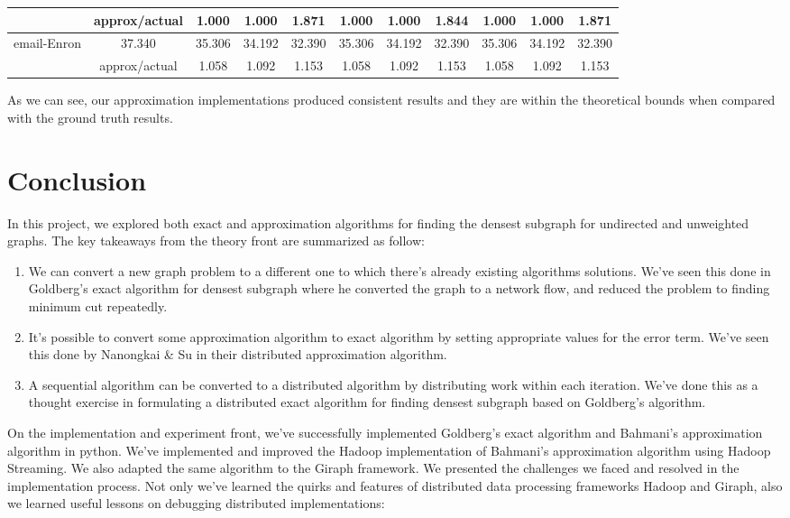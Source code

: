 \documentclass{article}
\begin{document}
\begin{landscape}
\begin{tabular}{|c|c|ccc|ccc|ccc|}
                               & approx/actual  & 1.000   & 1.000   & 1.871                    & 1.000   & 1.000   & 1.844    & 1.000   & 1.000   & 1.871      \\
\hline
\multirow{2}{*}{ email-Enron } & 37.340         & 35.306  & 34.192  & 32.390                   & 35.306  & 34.192  & 32.390   & 35.306  & 34.192  & 32.390     \\
                               & approx/actual  & 1.058   & 1.092   & 1.153                    & 1.058   & 1.092   & 1.153    & 1.058   & 1.092   & 1.153      \\
\hline
\end{tabular}

As we can see, our approximation implementations produced consistent results and they are within the theoretical bounds when compared with the ground truth results.

\end{landscape}


\section{Conclusion}
In this project, we explored both exact and approximation algorithms for finding the densest subgraph for undirected and unweighted graphs. The key takeaways from the theory front are summarized as follow:

\begin{enumerate}
  \item We can convert a new graph problem to a different one to which there's already existing algorithms solutions. We've seen this done in Goldberg's exact algorithm for densest subgraph where he converted the graph to a network flow, and reduced the problem to finding minimum cut repeatedly.
  \item It's possible to convert some approximation algorithm to exact algorithm by setting appropriate values for the error term. We've seen this done by Nanongkai \& Su in their distributed approximation algorithm.
  \item A sequential algorithm can be converted to a distributed algorithm by distributing work within each iteration. We've done this as a thought exercise in formulating a distributed exact algorithm for finding densest subgraph based on Goldberg's algorithm.
\end{enumerate}

On the implementation and experiment front, we've successfully implemented Goldberg's exact algorithm and Bahmani's approximation algorithm in python. We've implemented and improved the Hadoop implementation of Bahmani's approximation algorithm using Hadoop Streaming. We also adapted the same algorithm to the Giraph framework. We presented the challenges we faced and resolved in the implementation process. Not only we've learned the quirks and features of distributed data processing frameworks Hadoop and Giraph, also we learned useful lessons on debugging distributed implementations:
\end{document}
